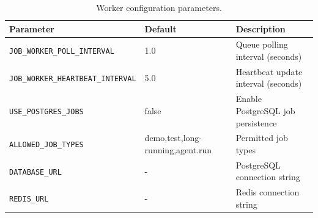 \begin{table}[ht]
\centering
\caption{Worker configuration parameters.}
\label{tab:worker-config}
\small
\begin{tabular}{lll}
\hline
\textbf{Parameter} & \textbf{Default} & \textbf{Description} \\
\hline
\texttt{JOB\_WORKER\_POLL\_INTERVAL} & 1.0 & Queue polling interval (seconds) \\
\texttt{JOB\_WORKER\_HEARTBEAT\_INTERVAL} & 5.0 & Heartbeat update interval (seconds) \\
\texttt{USE\_POSTGRES\_JOBS} & false & Enable PostgreSQL job persistence \\
\texttt{ALLOWED\_JOB\_TYPES} & demo,test,long-running,agent.run & Permitted job types \\
\texttt{DATABASE\_URL} & - & PostgreSQL connection string \\
\texttt{REDIS\_URL} & - & Redis connection string \\
\hline
\end{tabular}
\end{table}

